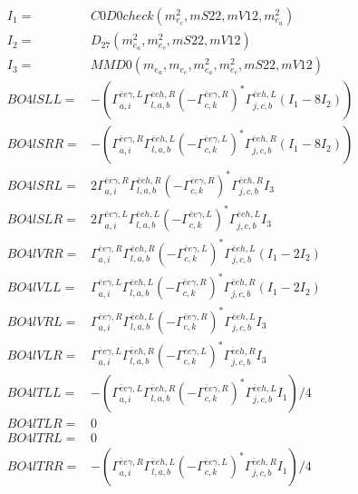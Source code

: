 \documentclass[A4,landscape]{article}
\begin{document}
\begin{align} 
I_1 = & C0D0check(m^2_{e_{{c}}}, mS22, mV12, m^2_{e_{{a}}}) \\ 
I_2 = & D_{27}(m^2_{e_{{a}}}, m^2_{e_{{c}}}, mS22, mV12) \\ 
I_3 = & MMD0(m_{e_{{a}}}, m_{e_{{c}}}, m^2_{e_{{a}}}, m^2_{e_{{c}}}, mS22, mV12) \\ 
  BO4lSLL= & -( \Gamma^{\bar{e}e \gamma ,L}_{a, i} \Gamma^{\bar{e}e h ,R}_{l, a, b} (- \Gamma^{\bar{e}e \gamma ,R} _{c, k})^* \Gamma^{\bar{e}e h ,L}_{j, c, b} (I_1 - 8 I_2)) \\ 
  BO4lSRR= & -( \Gamma^{\bar{e}e \gamma ,R}_{a, i} \Gamma^{\bar{e}e h ,L}_{l, a, b} (- \Gamma^{\bar{e}e \gamma ,L} _{c, k})^* \Gamma^{\bar{e}e h ,R}_{j, c, b} (I_1 - 8 I_2)) \\ 
  BO4lSRL= & 2  \Gamma^{\bar{e}e \gamma ,R}_{a, i} \Gamma^{\bar{e}e h ,R}_{l, a, b} (- \Gamma^{\bar{e}e \gamma ,R} _{c, k})^* \Gamma^{\bar{e}e h ,R}_{j, c, b} I_3 \\ 
  BO4lSLR= & 2  \Gamma^{\bar{e}e \gamma ,L}_{a, i} \Gamma^{\bar{e}e h ,L}_{l, a, b} (- \Gamma^{\bar{e}e \gamma ,L} _{c, k})^* \Gamma^{\bar{e}e h ,L}_{j, c, b} I_3 \\ 
  BO4lVRR= &  \Gamma^{\bar{e}e \gamma ,R}_{a, i} \Gamma^{\bar{e}e h ,R}_{l, a, b} (- \Gamma^{\bar{e}e \gamma ,L} _{c, k})^* \Gamma^{\bar{e}e h ,L}_{j, c, b} (I_1 - 2 I_2) \\ 
  BO4lVLL= &  \Gamma^{\bar{e}e \gamma ,L}_{a, i} \Gamma^{\bar{e}e h ,L}_{l, a, b} (- \Gamma^{\bar{e}e \gamma ,R} _{c, k})^* \Gamma^{\bar{e}e h ,R}_{j, c, b} (I_1 - 2 I_2) \\ 
  BO4lVRL= &  \Gamma^{\bar{e}e \gamma ,R}_{a, i} \Gamma^{\bar{e}e h ,L}_{l, a, b} (- \Gamma^{\bar{e}e \gamma ,R} _{c, k})^* \Gamma^{\bar{e}e h ,L}_{j, c, b} I_3 \\ 
  BO4lVLR= &  \Gamma^{\bar{e}e \gamma ,L}_{a, i} \Gamma^{\bar{e}e h ,R}_{l, a, b} (- \Gamma^{\bar{e}e \gamma ,L} _{c, k})^* \Gamma^{\bar{e}e h ,R}_{j, c, b} I_3 \\ 
  BO4lTLL= & -( \Gamma^{\bar{e}e \gamma ,L}_{a, i} \Gamma^{\bar{e}e h ,R}_{l, a, b} (- \Gamma^{\bar{e}e \gamma ,R} _{c, k})^* \Gamma^{\bar{e}e h ,L}_{j, c, b} I_1)/4 \\ 
  BO4lTLR= & 0 \\ 
  BO4lTRL= & 0 \\ 
  BO4lTRR= & -( \Gamma^{\bar{e}e \gamma ,R}_{a, i} \Gamma^{\bar{e}e h ,L}_{l, a, b} (- \Gamma^{\bar{e}e \gamma ,L} _{c, k})^* \Gamma^{\bar{e}e h ,R}_{j, c, b} I_1)/4 \\ 
\end{align} 
\end{document}
